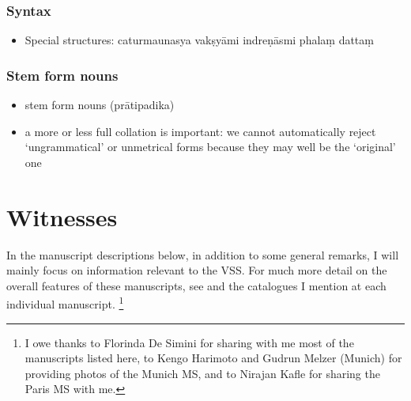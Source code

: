 \documentclass[11pt]{book}
\begin{document}
\subsubsection{Syntax}

\begin{itemize}

\item
  Special structures: caturmaunasya vakṣyāmi indreṇāsmi phalaṃ dattaṃ
\end{itemize}


\subsubsection{Stem form nouns}

\begin{itemize}
\item
  stem form nouns (prātipadika)
\item
  a more or less full collation is important: we cannot automatically
  reject `ungrammatical' or unmetrical forms because they may well be
  the `original' one
\end{itemize}




\vfill
\pagebreak




\section{Witnesses}
\frenchspacing

\noindent
In the manuscript descriptions below, in addition to some general
remarks, I will mainly focus on information relevant to the VSS. For
much more detail on the overall features of these manuscripts, see 
 and the catalogues I mention
at each individual manuscript.%
		\footnote{I owe thanks to Florinda De Simini for 
			sharing with me most of the manuscripts listed here, to
  			Kengo Harimoto and Gudrun Melzer (Munich) for 
  			providing photos of the  Munich MS, and to 
  			Nirajan Kafle for sharing the Paris MS with me.}
\end{document}
